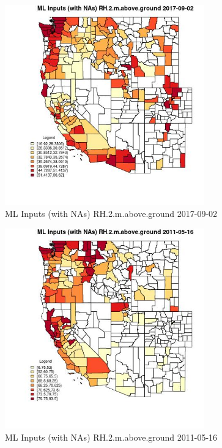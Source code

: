 \clearpage 

\begin{figure} 
\centering  
\includegraphics[width=0.77\textwidth]{Code_Outputs/Report_ML_input_PM25_Step4_part_e_de_duplicated_aves_compiled_2019-05-21wNAs_CountyRH2mabovegroundMean2017-09-02.jpg} 
\caption{\label{fig:Report_ML_input_PM25_Step4_part_e_de_duplicated_aves_compiled_2019-05-21wNAsCountyRH2mabovegroundMean2017-09-02}ML Inputs (with NAs) RH.2.m.above.ground 2017-09-02} 
\end{figure} 
 

\begin{figure} 
\centering  
\includegraphics[width=0.77\textwidth]{Code_Outputs/Report_ML_input_PM25_Step4_part_e_de_duplicated_aves_compiled_2019-05-21wNAs_CountyRH2mabovegroundMean2011-05-16.jpg} 
\caption{\label{fig:Report_ML_input_PM25_Step4_part_e_de_duplicated_aves_compiled_2019-05-21wNAsCountyRH2mabovegroundMean2011-05-16}ML Inputs (with NAs) RH.2.m.above.ground 2011-05-16} 
\end{figure} 
 

